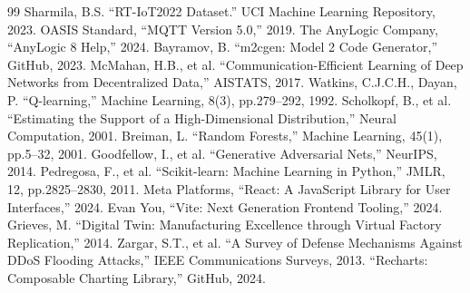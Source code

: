\documentclass[12pt,a4paper]{report}
\begin{document}
\begin{thebibliography}{99}
 Sharmila, B.S. ``RT-IoT2022 Dataset.'' UCI Machine Learning Repository, 2023.
 OASIS Standard, ``MQTT Version 5.0,'' 2019.
 The AnyLogic Company, ``AnyLogic 8 Help,'' 2024.
 Bayramov, B. ``m2cgen: Model 2 Code Generator,'' GitHub, 2023.
 McMahan, H.B., et al. ``Communication-Efficient Learning of Deep Networks from Decentralized Data,'' AISTATS, 2017.
 Watkins, C.J.C.H., Dayan, P. ``Q-learning,'' Machine Learning, 8(3), pp.279--292, 1992.
 Scholkopf, B., et al. ``Estimating the Support of a High-Dimensional Distribution,'' Neural Computation, 2001.
 Breiman, L. ``Random Forests,'' Machine Learning, 45(1), pp.5--32, 2001.
 Goodfellow, I., et al. ``Generative Adversarial Nets,'' NeurIPS, 2014.
 Pedregosa, F., et al. ``Scikit-learn: Machine Learning in Python,'' JMLR, 12, pp.2825--2830, 2011.
 Meta Platforms, ``React: A JavaScript Library for User Interfaces,'' 2024.
 Evan You, ``Vite: Next Generation Frontend Tooling,'' 2024.
 Grieves, M. ``Digital Twin: Manufacturing Excellence through Virtual Factory Replication,'' 2014.
 Zargar, S.T., et al. ``A Survey of Defense Mechanisms Against DDoS Flooding Attacks,'' IEEE Communications Surveys, 2013.
 ``Recharts: Composable Charting Library,'' GitHub, 2024.
\end{thebibliography}
\end{document}
